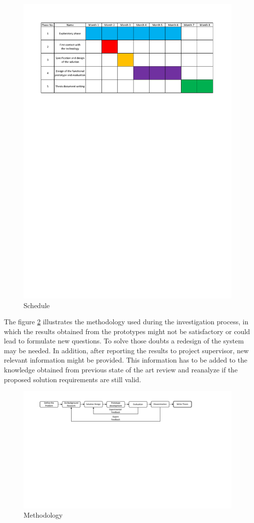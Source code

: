 \begin{figure}[!htp]
  \center
  \includegraphics[width=1\textwidth]{figures/schedule}
  \caption{Schedule}
  \label{fig:schedule}
\end{figure}

\FloatBarrier

The figure \ref{fig:methodology} illustrates the methodology used during the investigation process, in which the results obtained from the prototypes might not be satisfactory or could lead to formulate new questions. To solve those doubts a redesign of the system may be needed. In addition, after reporting the results to project supervisor, new relevant information might be provided. This information has to be added to the knowledge obtained from previous state of the art review and reanalyze if the proposed solution requirements are still valid. 

\begin{figure}[!htp]
  \center
  \includegraphics[width=1\textwidth]{figures/scientific_methodology}
  \caption{Methodology}
  \label{fig:methodology}
\end{figure}